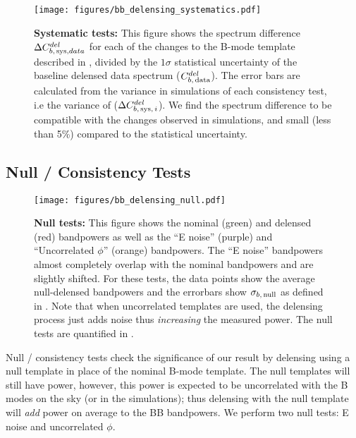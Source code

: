 \begin{figure}
\begin{center}
\texttt{[image: figures/bb\_delensing\_systematics.pdf]}
\caption{\textbf{Systematic tests:}
  This figure shows the spectrum difference $\Delta C^{del}_{b,\,{\rm sys},data}$ for each of the changes to the B-mode template described in , divided by the $1\sigma$ statistical uncertainty of the baseline delensed data spectrum ($C^{del}_{b,\,{\rm data}}$).
  The error bars are calculated from the variance in simulations of each consistency test, i.e the variance of ($\Delta C^{del}_{b,\,{\rm sys},\,i}$).
  We find the spectrum difference to be compatible with the changes observed in simulations, and small (less than 5\%) compared to the statistical uncertainty.
}
\label{fig:sys_diff}
\end{center}
\end{figure}



\subsection{Null / Consistency Tests}
\label{sec:null}

\begin{figure}
\begin{center}
\texttt{[image: figures/bb\_delensing\_null.pdf]}
\caption{\textbf{Null tests:}
This figure shows the nominal (green) and delensed (red) bandpowers as well as the ``E noise'' (purple) and ``Uncorrelated $\phi$'' (orange) bandpowers.
The ``E noise'' bandpowers almost completely overlap with the nominal bandpowers and are slightly shifted.
For these tests, the data points show the average null-delensed bandpowers and the errorbars show $\sigma_{b,\, {\rm null}}$ as defined in .
Note that when uncorrelated templates are used, the delensing process just adds noise thus \textit{increasing} the measured power.
The null tests are quantified in .
}
\label{fig:null}
\end{center}
\end{figure}

Null / consistency tests check the significance of our result by delensing using a null template in place of the nominal B-mode template.
The null templates will still have power, however, this power is expected to be uncorrelated with the B modes on the sky (or in the simulations);
thus delensing with the null template will \textit{add} power on average to the BB bandpowers.
We perform two null tests: E noise and uncorrelated $\phi$.

